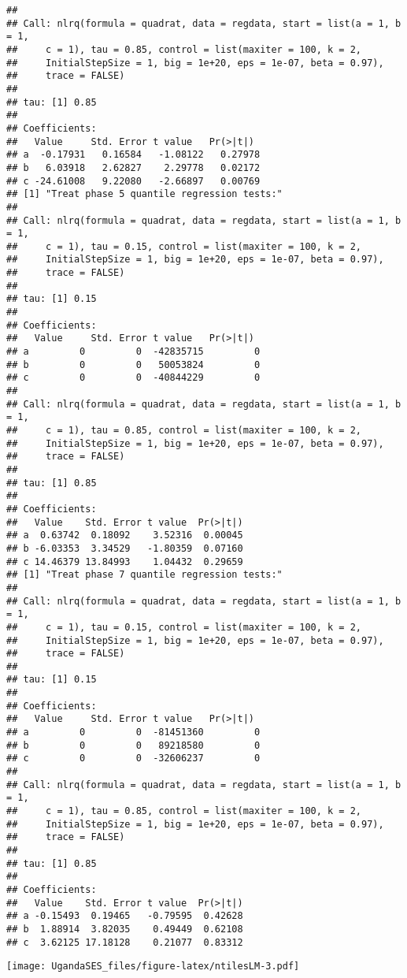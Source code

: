 \documentclass[
]{article}
\begin{document}
\begin{verbatim}
## 
## Call: nlrq(formula = quadrat, data = regdata, start = list(a = 1, b = 1, 
##     c = 1), tau = 0.85, control = list(maxiter = 100, k = 2, 
##     InitialStepSize = 1, big = 1e+20, eps = 1e-07, beta = 0.97), 
##     trace = FALSE)
## 
## tau: [1] 0.85
## 
## Coefficients:
##   Value     Std. Error t value   Pr(>|t|) 
## a  -0.17931   0.16584   -1.08122   0.27978
## b   6.03918   2.62827    2.29778   0.02172
## c -24.61008   9.22080   -2.66897   0.00769
## [1] "Treat phase 5 quantile regression tests:"
## 
## Call: nlrq(formula = quadrat, data = regdata, start = list(a = 1, b = 1, 
##     c = 1), tau = 0.15, control = list(maxiter = 100, k = 2, 
##     InitialStepSize = 1, big = 1e+20, eps = 1e-07, beta = 0.97), 
##     trace = FALSE)
## 
## tau: [1] 0.15
## 
## Coefficients:
##   Value     Std. Error t value   Pr(>|t|) 
## a         0         0  -42835715         0
## b         0         0   50053824         0
## c         0         0  -40844229         0
## 
## Call: nlrq(formula = quadrat, data = regdata, start = list(a = 1, b = 1, 
##     c = 1), tau = 0.85, control = list(maxiter = 100, k = 2, 
##     InitialStepSize = 1, big = 1e+20, eps = 1e-07, beta = 0.97), 
##     trace = FALSE)
## 
## tau: [1] 0.85
## 
## Coefficients:
##   Value    Std. Error t value  Pr(>|t|)
## a  0.63742  0.18092    3.52316  0.00045
## b -6.03353  3.34529   -1.80359  0.07160
## c 14.46379 13.84993    1.04432  0.29659
## [1] "Treat phase 7 quantile regression tests:"
## 
## Call: nlrq(formula = quadrat, data = regdata, start = list(a = 1, b = 1, 
##     c = 1), tau = 0.15, control = list(maxiter = 100, k = 2, 
##     InitialStepSize = 1, big = 1e+20, eps = 1e-07, beta = 0.97), 
##     trace = FALSE)
## 
## tau: [1] 0.15
## 
## Coefficients:
##   Value     Std. Error t value   Pr(>|t|) 
## a         0         0  -81451360         0
## b         0         0   89218580         0
## c         0         0  -32606237         0
## 
## Call: nlrq(formula = quadrat, data = regdata, start = list(a = 1, b = 1, 
##     c = 1), tau = 0.85, control = list(maxiter = 100, k = 2, 
##     InitialStepSize = 1, big = 1e+20, eps = 1e-07, beta = 0.97), 
##     trace = FALSE)
## 
## tau: [1] 0.85
## 
## Coefficients:
##   Value    Std. Error t value  Pr(>|t|)
## a -0.15493  0.19465   -0.79595  0.42628
## b  1.88914  3.82035    0.49449  0.62108
## c  3.62125 17.18128    0.21077  0.83312
\end{verbatim}

\texttt{[image: UgandaSES\_files/figure-latex/ntilesLM-3.pdf]}
\end{document}
